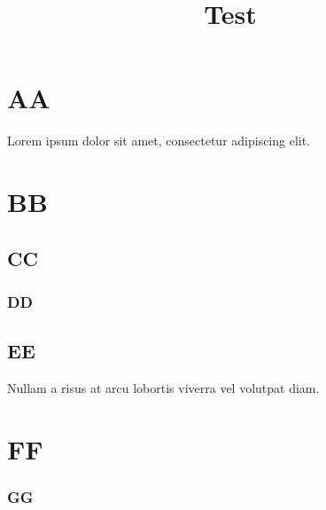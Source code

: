 \documentclass{article}
\title{Test}
\begin{document}
	\tableofcontents
	\newpage
	
	\section{AA}
	Lorem ipsum dolor sit amet, consectetur adipiscing elit.
	\section{BB}
	\subsection{CC}
	\subsubsection{DD}
	\subsection{EE}
	Nullam a risus at arcu lobortis viverra vel volutpat diam.
	\section{FF}
	\subsubsection{GG}
\end{document}
